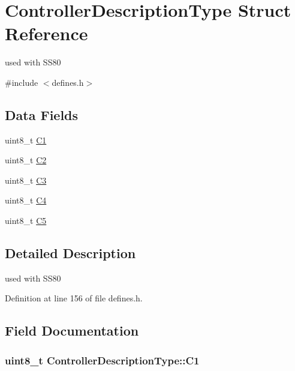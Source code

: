 \hypertarget{structControllerDescriptionType}{}\section{Controller\+Description\+Type Struct Reference}
\label{structControllerDescriptionType}


used with S\+S80  




{\ttfamily \#include $<$defines.\+h$>$}

\subsection*{Data Fields}
\begin{DoxyCompactItemize}
\item 
uint8\+\_\+t \hyperlink{structControllerDescriptionType_a042a33e692d7d242a384d8edc94af2f2}{C1}
\item 
uint8\+\_\+t \hyperlink{structControllerDescriptionType_ae2ac8a001bde9c68f92c6bb3a7287517}{C2}
\item 
uint8\+\_\+t \hyperlink{structControllerDescriptionType_ad24f2f797685ffd8f0bc96a800e5a6a8}{C3}
\item 
uint8\+\_\+t \hyperlink{structControllerDescriptionType_abc2badc5707de3327d15a00919fb7e08}{C4}
\item 
uint8\+\_\+t \hyperlink{structControllerDescriptionType_a5b520889371f53fb89e36a0de5f071e9}{C5}
\end{DoxyCompactItemize}


\subsection{Detailed Description}
used with S\+S80 

Definition at line 156 of file defines.\+h.



\subsection{Field Documentation}
\subsubsection[{\texorpdfstring{C1}{C1}}]{\setlength{\rightskip}{0pt plus 5cm}uint8\+\_\+t Controller\+Description\+Type\+::\+C1}\hypertarget{structControllerDescriptionType_a042a33e692d7d242a384d8edc94af2f2}{}\label{structControllerDescriptionType_a042a33e692d7d242a384d8edc94af2f2}


